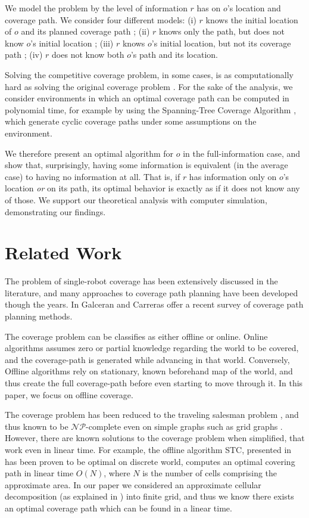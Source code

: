 \documentclass[a4paper,10pt]{article}
\newcommand\rob{\ensuremath{r}\xspace}
\newcommand\opp{\ensuremath{o}\xspace}
\begin{document}
We model the problem by the level of information \rob has on \opp's location and coverage path. We consider four different models: (i) \rob knows the initial location of \opp and its planned coverage path ; (ii) \rob knows only the path, but does not know \opp's initial location ; (iii) \rob knows \opp's initial location, but not its coverage path ; (iv) \rob does not know both \opp's path and its location.

Solving the competitive coverage problem, in some cases, is as computationally hard as solving the original coverage problem \cite{arkin2000approximation}. For the sake of the analysis, we consider environments in which an optimal coverage path can be computed in polynomial time, for example by using the Spanning-Tree Coverage Algorithm \cite{gabriely2001spanning}, which generate cyclic coverage paths under some assumptions on the environment. 

We therefore present an optimal algorithm for \opp in the full-information case, and show that, surprisingly, having some information is equivalent (in the average case) to having no information at all. That is, if \rob has information only on \opp's location {\em or} on its path, its optimal behavior is exactly as if it does not know any of those. We support our theoretical analysis with computer simulation, demonstrating our findings. 

\section{Related Work}

The problem of single-robot coverage has been extensively discussed in the literature, and many approaches to coverage path planning have been developed though the years. In \cite{galceran2013survey} Galceran and Carreras offer a recent survey of coverage path planning methods.

The coverage problem can be classifies as either offline or online. 
Online algorithms assumes zero or partial knowledge regarding the world to be covered, and the coverage-path is generated while advancing in that world. Conversely, Offline algorithms rely on stationary, known beforehand map of the world, and thus create the full coverage-path before even starting to move through it. In this paper, we focus on offline coverage.

The coverage problem has been reduced to the traveling salesman problem \cite{arkin2000approximation}, and thus known to be $\mathcal{NP}$-complete even on simple graphs such as grid graphs \cite{papadimitriou1977euclidean}. However, there are known solutions to the coverage problem when simplified, that work even in linear time. For example, the offline algorithm STC, presented in \cite{gabriely2001spanning} has been proven to be optimal on discrete world, computes an optimal covering path in linear time $O(N)$, where $N$ is the number of cells comprising the approximate area. In our paper we considered an approximate cellular decomposition (as explained in \cite{galceran2013survey}) into finite grid, and thus we know there exists an optimal coverage path which can be found in a linear time.
\end{document}
